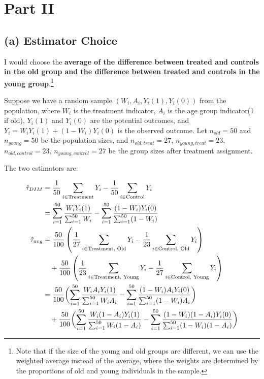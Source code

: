 \documentclass[11pt]{article}
\numberwithin{equation}{section}
\begin{document}
\section{Part II}



\subsection{(a) Estimator Choice}


I would choose the \textbf{average of the difference between treated and controls in the old group and the difference between treated and controls in the young group}.\footnote{Note that if the size of the young and old groups are different, we can use the weighted average instead of the average, where the weights are determined by the proportions of old and young individuals in the sample.}


Suppose we have a random sample $(W_i, A_i, Y_i(1), Y_i(0))$ from the population, where $W_i$ is the treatment indicator, $A_i$ is the age group indicator(1 if old), $Y_i(1)$ and $Y_i(0)$ are the potential outcomes, and $Y_i = W_iY_i(1) + (1-W_i)Y_i(0)$ is the observed outcome.
Let $n_{old} = 50$ and $n_{young} = 50$ be the population sizes, and $n_{old,treat} = 27$, $n_{young,treat} = 23$, $n_{old,control} = 23$, $n_{young,control} = 27$ be the group sizes after treatment assignment.

The two estimators are:

\begin{align}
\hat{\tau}_{DIM} &= \frac{1}{50} \sum_{i \in \text{Treatment}} Y_i - \frac{1}{50} \sum_{i \in \text{Control}} Y_i \\
&= \sum_{i=1}^{50}\frac{W_iY_i(1)}{\sum_{i=1}^{50}W_i} - \sum_{i=1}^{50}\frac{(1-W_i)Y_i(0)}{\sum_{i=1}^{50}(1-W_i)}\notag\\
\hat{\tau}_{avg} &= \frac{50}{100} \left(\frac{1}{27} \sum_{i \in \text{Treatment, Old}} Y_i - \frac{1}{23} \sum_{i \in \text{Control, Old}} Y_i\right) \\
&\quad + \frac{50}{100} \left(\frac{1}{23} \sum_{i \in \text{Treatment, Young}} Y_i - \frac{1}{27} \sum_{i \in \text{Control, Young}} Y_i\right)\notag\\
&= \frac{50}{100}\biggl(\sum_{i=1}^{50}\frac{W_iA_iY_i(1)}{\sum_{i=1}^{50}W_iA_i} - \sum_{i=1}^{50}\frac{(1-W_i)A_iY_i(0)}{\sum_{i=1}^{50}(1-W_i)A_i}\biggr)\notag\\
&\quad + \frac{50}{100}\biggl(\sum_{i=1}^{50}\frac{W_i(1-A_i)Y_i(1)}{\sum_{i=1}^{50}W_i(1-A_i)} - \sum_{i=1}^{50}\frac{(1-W_i)(1-A_i)Y_i(0)}{\sum_{i=1}^{50}(1-W_i)(1-A_i)}\biggr)\notag
\end{align}
\end{document}
